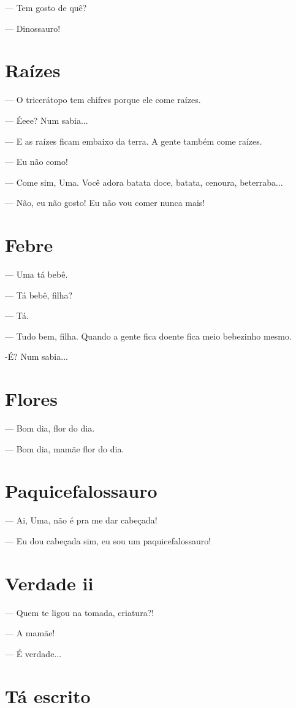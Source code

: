 {— Tem gosto de quê?

— Dinossauro!

\chapter{Raízes}

— O tricerátopo tem chifres porque ele come raízes.

— Éeee? Num sabia...

— E as raízes ficam embaixo da terra. A gente também come raízes.

— Eu não como!

— Come sim, Uma. Você adora batata doce, batata, cenoura, beterraba...

— Não, eu não gosto! Eu não vou comer nunca mais!

\chapter{Febre}

— Uma tá bebê.

— Tá bebê, filha?

— Tá.

— Tudo bem, filha. Quando a gente fica doente fica meio bebezinho mesmo.

-É? Num sabia...

\chapter{Flores}

— Bom dia, flor do dia.

— Bom dia, mamãe flor do dia.

\chapter{Paquicefalossauro}

— Ai, Uma, não é pra me dar cabeçada!

— Eu dou cabeçada sim, eu sou um paquicefalossauro!

\chapter{Verdade ii}

— Quem te ligou na tomada, criatura?!

— A mamãe!

— É verdade...

\chapter{Tá escrito}

}
